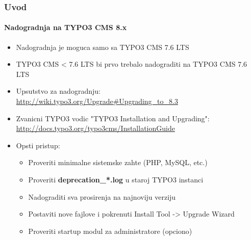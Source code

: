 \begin{frame}[fragile]
	\frametitle{Uvod}
	\framesubtitle{Nadogradnja na TYPO3 CMS 8.x}

	\begin{itemize}
		\item Nadogradnja je moguca samo sa TYPO3 CMS 7.6 LTS
		\item TYPO3 CMS < 7.6 LTS bi prvo trebalo nadograditi na TYPO3 CMS 7.6 LTS
	\end{itemize}

	\begin{itemize}

		\item Upsutstvo za nadogradnju:\newline
			\smaller\url{http://wiki.typo3.org/Upgrade#Upgrading_to_8.3}\normalsize
		\item Zvanicni TYPO3 vodic "TYPO3 Installation and Upgrading":
			\smaller\url{http://docs.typo3.org/typo3cms/InstallationGuide}\normalsize
		\item Opsti pristup:
			\begin{itemize}
				\item Proveriti minimalne sistemske zahte \small(PHP, MySQL, etc.)
				\item Proveriti \textbf{deprecation\_*.log} u staroj TYPO3 instanci
				\item Nadograditi sva prosirenja na najnoviju verziju
				\item Postaviti nove fajlove i pokrenuti Install Tool -> Upgrade Wizard
				\item Proveriti startup modul za administratore (opciono)
			\end{itemize}
	\end{itemize}

\end{frame}


